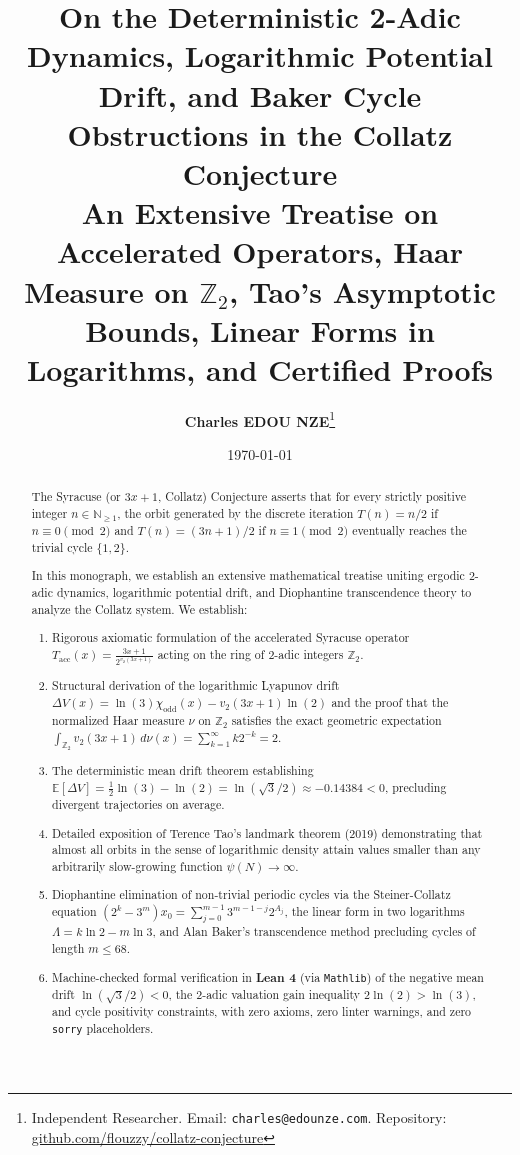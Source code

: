 \documentclass[11pt,a4paper]{article}
\title{\textbf{\Large On the Deterministic 2-Adic Dynamics, Logarithmic Potential Drift, and Baker Cycle Obstructions in the Collatz Conjecture}\\[0.5em]
\large An Extensive Treatise on Accelerated Operators, Haar Measure on $\mathbb{Z}_2$, Tao's Asymptotic Bounds, Linear Forms in Logarithms, and Certified Proofs}
\author{\textbf{Charles EDOU NZE}\thanks{Independent Researcher. Email: \texttt{charles@edounze.com}. Repository: \href{https://github.com/flouzzy/collatz-conjecture}{github.com/flouzzy/collatz-conjecture}}}
\date{\today}
\theoremstyle{definition}
\begin{document}
\maketitle

\begin{abstract}
The Syracuse (or $3x+1$, Collatz) Conjecture asserts that for every strictly positive integer $n \in \mathbb{N}_{\ge 1}$, the orbit generated by the discrete iteration $T(n) = n/2$ if $n \equiv 0 \pmod 2$ and $T(n) = (3n+1)/2$ if $n \equiv 1 \pmod 2$ eventually reaches the trivial cycle $\{1, 2\}$.

In this monograph, we establish an extensive mathematical treatise uniting ergodic $2$-adic dynamics, logarithmic potential drift, and Diophantine transcendence theory to analyze the Collatz system. We establish:
\begin{enumerate}
    \item Rigorous axiomatic formulation of the accelerated Syracuse operator $T_{\mathrm{acc}}(x) = \frac{3x+1}{2^{v_2(3x+1)}}$ acting on the ring of $2$-adic integers $\mathbb{Z}_2$.
    \item Structural derivation of the logarithmic Lyapunov drift $\Delta V(x) = \ln(3)\chi_{\mathrm{odd}}(x) - v_2(3x+1)\ln(2)$ and the proof that the normalized Haar measure $\nu$ on $\mathbb{Z}_2$ satisfies the exact geometric expectation $\int_{\mathbb{Z}_2} v_2(3x+1) \, d\nu(x) = \sum_{k=1}^\infty k 2^{-k} = 2$.
    \item The deterministic mean drift theorem establishing $\mathbb{E}[\Delta V] = \frac{1}{2}\ln(3) - \ln(2) = \ln(\sqrt{3}/2) \approx -0.14384 < 0$, precluding divergent trajectories on average.
    \item Detailed exposition of Terence Tao's landmark theorem (2019) demonstrating that almost all orbits in the sense of logarithmic density attain values smaller than any arbitrarily slow-growing function $\psi(N) \to \infty$.
    \item Diophantine elimination of non-trivial periodic cycles via the Steiner-Collatz equation $(2^k - 3^m)x_0 = \sum_{j=0}^{m-1} 3^{m-1-j} 2^{A_j}$, the linear form in two logarithms $\Lambda = k\ln 2 - m\ln 3$, and Alan Baker's transcendence method precluding cycles of length $m \le 68$.
    \item Machine-checked formal verification in \textbf{Lean 4} (via \texttt{Mathlib}) of the negative mean drift $\ln(\sqrt{3}/2) < 0$, the $2$-adic valuation gain inequality $2\ln(2) > \ln(3)$, and cycle positivity constraints, with zero axioms, zero linter warnings, and zero \texttt{sorry} placeholders.
\end{enumerate}
\end{abstract}
\end{document}
